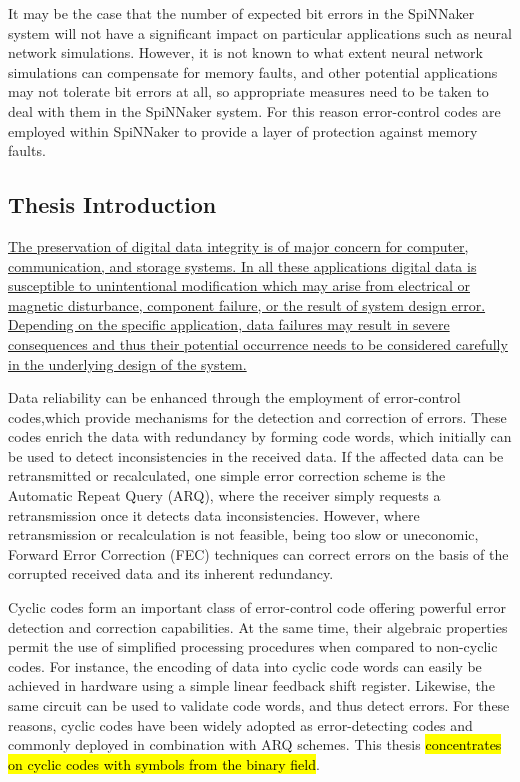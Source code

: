 \documentclass[a4paper, 11pt]{article}
\begin{document}
It may be the case that the number of expected bit errors in the SpiNNaker system will not have a significant impact on particular applications such as neural network simulations. However, it is not known to what extent neural network simulations can compensate for memory faults, and other potential applications may not tolerate bit errors at all, so appropriate measures need to be taken to deal with them in the SpiNNaker system. For this reason error-control codes are employed within SpiNNaker to provide a layer of protection against memory faults.

\subsection{Thesis Introduction}
\ul{The preservation of digital data integrity is of major concern for computer, communication, and storage systems. In all these applications digital data is susceptible to unintentional modification which may arise from electrical or magnetic disturbance, component failure, or the result of system design error. Depending on the specific application, data failures may result in severe consequences and thus their potential occurrence needs to be considered carefully in the underlying design of the system.}

Data reliability can be enhanced through the employment of error-control codes,which provide mechanisms for the detection and correction of errors. These codes enrich the data with redundancy by forming code words, which initially can be used to detect inconsistencies in the received data. If the affected data can be retransmitted or recalculated, one simple error correction scheme is the Automatic Repeat Query (ARQ), where the receiver simply requests a retransmission once it detects data inconsistencies. However, where retransmission or recalculation is not feasible, being too slow or uneconomic, Forward Error Correction (FEC) techniques can correct errors on the basis of the corrupted received data and its inherent redundancy.

Cyclic codes form an important class of error-control code offering powerful error detection and correction capabilities. At the same time, their algebraic properties permit the use of simplified processing procedures when compared to non-cyclic codes. For instance, the encoding of data into cyclic code words can easily be achieved in hardware using a simple linear feedback shift register. Likewise, the same circuit can be used to validate code words, and thus detect errors. For these reasons, cyclic codes have been widely adopted as error-detecting codes and commonly deployed in combination with ARQ schemes. This thesis \hl{concentrates on cyclic codes with symbols from the binary field}.
\end{document}
